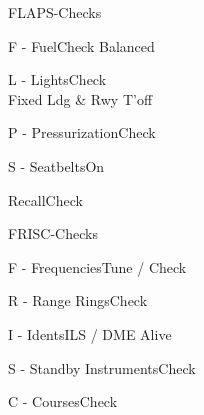 \documentclass[sim-use, blue_items, halfpage]{checklist}
\begin{document}
\clearpage

\begin{checklist}{FLAPS-Checks}
  \item{F - Fuel}{Check Balanced}
  \item{L - Lights}{Check\\Fixed Ldg \& Rwy T'off}
  \item{P - Pressurization}{Check}
  \item{S - Seatbelts}{On}
  \item{Recall}{Check}
\end{checklist}

\begin{checklist}{FRISC-Checks}
  \item{F - Frequencies}{Tune / Check}
  \item{R - Range Rings}{Check}
  \item{I - Idents}{ILS / DME Alive}
  \item{S - Standby Instruments}{Check}
  \item{C - Courses}{Check}
\end{checklist}
\end{document}
